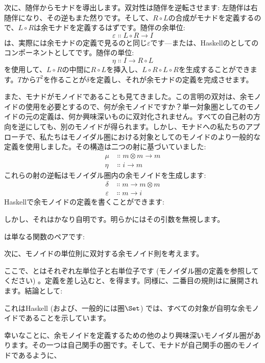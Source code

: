 次に、随伴からモナドを導出します。双対性は随伴を逆転させます: 左随伴は右随伴になり、その逆もまた然りです。そして、$R \circ L$の合成がモナドを定義するので、$L \circ R$は余モナドを定義するはずです。随伴の余単位: 
\[\varepsilon \Colon L \circ R \to I\]
は、実際には余モナドの定義で見るのと同じ$\varepsilon$です---または、Haskellのとしてのコンポーネントとしてです。随伴の単位: 
\[\eta \Colon I \to R \circ L\]
を使用して、$L \circ R$の中間に$R \circ L$を挿入し、$L \circ R \circ L \circ R$を生成することができます。$T$から$T^2$を作ることが$\delta$を定義し、それが余モナドの定義を完成させます。

また、モナドがモノイドであることも見てきました。この言明の双対は、余モノイドの使用を必要とするので、何が余モノイドですか？単一対象圏としてのモノイドの元の定義は、何か興味深いものに双対化されません。すべての自己射の方向を逆にしても、別のモノイドが得られます。しかし、モナドへの私たちのアプローチで、私たちはモノイダル圏における対象としてのモノイドのより一般的な定義を使用しました。その構造は二つの射に基づいていました: 
\begin{align*}
  \mu  & \Colon m \otimes m \to m \\
  \eta & \Colon i \to m
\end{align*}
これらの射の逆転はモノイダル圏内の余モノイドを生成します: 
\begin{align*}
  \delta      & \Colon m \to m \otimes m \\
  \varepsilon & \Colon m \to i
\end{align*}
Haskellで余モノイドの定義を書くことができます: 

しかし、それはかなり自明です。明らかにはその引数を無視します。

は単なる関数のペアです: 

次に、モノイドの単位則に双対する余モノイド則を考えます。

ここで、とはそれぞれ左単位子と右単位子です (モノイダル圏の定義を参照してください) 。定義を差し込むと、を得ます。同様に、二番目の規則はに展開されます。結論として: 

これはHaskell (および、一般的には圏$\Set$) では、すべての対象が自明な余モノイドであることを示しています。

幸いなことに、余モノイドを定義するための他のより興味深いモノイダル圏があります。その一つは自己関手の圏です。そして、モナドが自己関手の圏のモノイドであるように、

